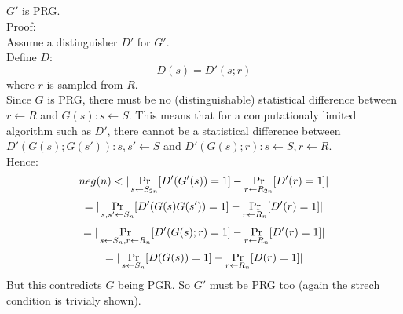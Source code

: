 \subsection{}
$G'$ is PRG.\\
Proof:\\
Assume a distinguisher $D'$ for $G'$.\\
Define $D$:\\
\[
	D(s)=D'(s;r)
\]
where $r$ is sampled from $R$.\\
Since $G$ is PRG, there must be no (distinguishable) statistical 
difference between $r\leftarrow R$ and $G(s):s\leftarrow S$. This means that
for a computationaly limited algorithm such as $D'$, there cannot be a
statistical difference between $D'(G(s);G(s')):s,s'\leftarrow S$ and
$D'(G(s);r):s\leftarrow S, r\leftarrow R$.\\
Hence:
\[
	neg(n)<|\pr_{s\leftarrow S_{2n}}[D'(G'(s))=1]
	-\pr_{r\leftarrow R_{2n}}[D'(r)=1]|\]\[
	=|\operatorname*{Pr}_{s,s'\leftarrow S_n}[D'(G(s)G(s'))=1]
	-\operatorname*{Pr}_{r\leftarrow R_n}[D'(r)=1]|\]\[
	=|\operatorname*{Pr}_{s\leftarrow S_n,r\leftarrow R_n}[D'(G(s);r)=1]
	-\operatorname*{Pr}_{r\leftarrow R_n}[D'(r)=1]|\]\[
	=|\operatorname*{Pr}_{s\leftarrow S_n}[D(G(s))=1]
	-\operatorname*{Pr}_{r\leftarrow R_n}[D(r)=1]|\]\[
\]
But this contredicts $G$ being PGR. So $G'$ must be PRG too (again the strech
condition is trivialy shown).
